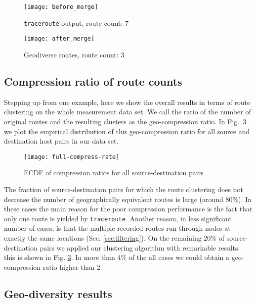 \documentclass[peerreview]{IEEEtran}
\begin{document}
\begin{figure*}
\centering
\begin{subfigure}[t]{.49\columnwidth}
\texttt{[image: before\_merge]}
\caption{\texttt{traceroute} output, route count: 7}
\label{fig:before-merge}
\end{subfigure}
\begin{subfigure}[t]{.49\columnwidth}
\texttt{[image: after\_merge]}
\caption{Geodiverse routes, route count: 3}\label{fig:after-merge}
\end{subfigure}
\caption{Route count comparison}
\label{fig:route_count_example}
\end{figure*}

\subsection{Compression ratio of route counts}

Stepping up from one example, here we show the overall results in terms of route
clustering on the whole measurement data set. We call the ratio of the number of
original routes and the resulting clusters as the geo-compression ratio. In
Fig.~\ref{fig:compression_all} we plot the empirical distribution of this
geo-compression ratio for all source and destination host pairs in our data set.
  
\begin{figure}[h]
	\centering
	\texttt{[image: full-compress-rate]}
	\caption{ECDF of compression ratios for all source-destination pairs}
	\label{fig:compression_all}
\end{figure}

The fraction of source-destination pairs for which the route clustering does not
decrease the number of geographically equivalent routes is large (around 80\%).
In these cases the main reason for the poor compression performance is the fact
that only one route is yielded by \texttt{traceroute}. Another reason, in less
significant number of cases, is that the multiple recorded routes run through
nodes at exactly the same locations (Sec. \ref{sec:filtering}). On the remaining
20\% of source-destination pairs we applied our clustering algorithm with
remarkable results: this is shown in Fig. \ref{fig:compression_all}. In more
than 4\% of the all cases we could obtain a geo-compression ratio higher than 2.

\subsection{Geo-diversity results}
\end{document}
